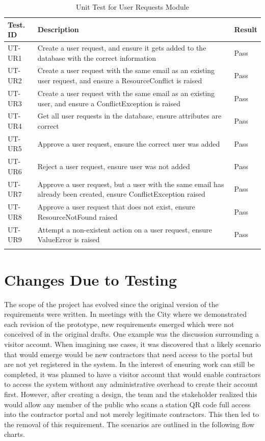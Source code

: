 \documentclass[12pt, titlepage]{article}
\begin{document}
\begin{longtable}{|m{2cm}|m{10cm}|m{1.4cm}|}
  \hline
  \textbf{Test. ID} & \textbf{Description} & \textbf{Result}\\ \hline
  UT-UR1 & Create a user request, and ensure it gets added to the
  database with the correct information & Pass\\ \hline
  UT-UR2 & Create a user request with the same email as an existing
  user request, and ensure a ResourceConflict is raised & Pass\\ \hline
  UT-UR3 & Create a user request with the same email as an existing
  user, and ensure a ConflictException is raised & Pass\\ \hline
  UT-UR4 & Get all user requests in the database, ensure attributes
  are correct & Pass\\ \hline
  UT-UR5 & Approve a user request, ensure the correct user was added
  & Pass\\ \hline
  UT-UR6 & Reject a user request, ensure user was not added & Pass\\ \hline
  UT-UR7 & Approve a user request, but a user with the same email has
  already been created, ensure ConflictException raised & Pass\\ \hline
  UT-UR8 & Approve a user request that does not exist, ensure
  ResourceNotFound raised & Pass\\ \hline
  UT-UR9 & Attempt a non-existent action on a user request, ensure
  ValueError is raised & Pass\\ \hline
  \caption{Unit Test for User Requests Module}
\end{longtable}

\section{Changes Due to Testing}

The scope of the project has evolved since the original version of
the requirements were written.
In meetings with the City where we demonstrated each revision of the
prototype, new requirements emerged which were not conceived
of in the original drafts. One example was the discussion surrounding
a visitor account. When imagining use cases, it was discovered
that a likely scenario that would emerge would be new contractors
that need access to the portal but are not yet registered in the
system. In the interest of ensuring work can still be completed, it
was planned to have a visitor account that would enable contractors
to access the system without any administrative overhead to create
their account first. However, after creating a design, the team and
the stakeholder realized this would allow any member of the public
who scans a station QR code full access into the contractor portal and
not merely legitimate contractors. This then led to the removal of
this requirement. The scenarios are outlined in the following flow charts.
\newpage
\end{document}
